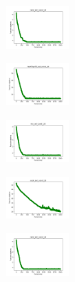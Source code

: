 \begin{figure}[H]
    \begin{subfigure}
        \centering
        \includegraphics[width=0.234\textwidth]{img/aggun/rand_set_const_20_277451237_cost.png}
    \end{subfigure}
    \hfill
    \begin{subfigure}
        \centering
        \includegraphics[width=0.234\textwidth]{img/aggun/newthyroid_set_const_20_277451237_cost.png}
    \end{subfigure}
    \hfill
    \begin{subfigure}
        \centering
        \includegraphics[width=0.234\textwidth]{img/aggun/iris_set_const_20_49258669_cost.png}
    \end{subfigure}
    \hfill
    \begin{subfigure}
        \centering
        \includegraphics[width=0.234\textwidth]{img/aggun/ecoli_set_const_20_49258669_cost.png}
    \end{subfigure}
    \hfill
    \begin{subfigure}
        \centering
        \includegraphics[width=0.234\textwidth]{img/aggun/rand_set_const_20_49258669_cost.png}
    \end{subfigure}
    \hfill
    \begin{subfigure}
        \centering

\end{subfigure}
\end{figure}
